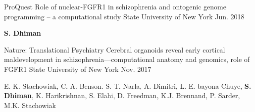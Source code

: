 \begin{cventries}
  \cventry
    {ProQuest} %
    {Role of nuclear-FGFR1 in schizophrenia and ontogenic genome programming – a computational study} %
    {State University of New York} %
    {Jun. 2018} %
    {
      \begin{cvitems} %
        \item {\textbf{S. Dhiman}}
      \end{cvitems}
    }
  \cventry
    {Nature: Translational Psychiatry} %
    {Cerebral organoids reveal early cortical maldevelopment in schizophrenia—computational anatomy and genomics, role of FGFR1} %
    {State University of New York} %
    {Nov. 2017} %
    {
      \begin{cvitems} %
        \item {E. K. Stachowiak, C. A. Benson. S. T. Narla, A. Dimitri, L. E. bayona Chuye, \textbf{S. Dhiman}, K. Harikrishnan, S. Elahi, D. Freedman, K.J. Brennand, P. Sarder, M.K. Stachowiak}
      \end{cvitems}
    }
    

\end{cventries}
